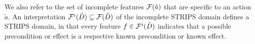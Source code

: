 \documentclass{article}
\newtheorem{theorem}{Theorem}[section]
\begin{document}
%
We also refer to the set of incomplete features ${\cal F}(\tilde{a})$ that are specific to an action $\tilde{a}$. An interpretation ${\cal F}^i(\tilde{D}) \subseteq {\cal F}(\tilde{D})$ of the incomplete STRIPS domain defines a STRIPS domain, in that every feature $f \in {\cal F}^i(\tilde{D})$ indicates that a possible precondition or effect is a respective known precondition or known effect.

%
%
%
\end{document}
